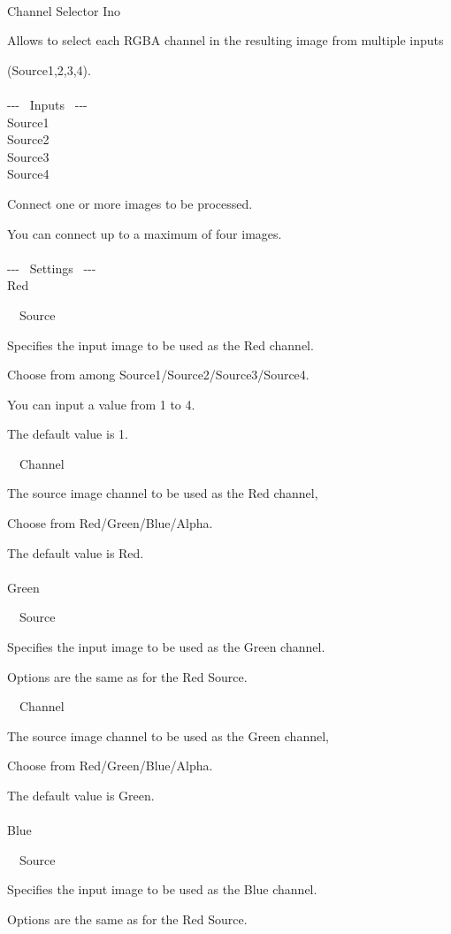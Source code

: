\documentclass[a4paper,12pt]{article}
\begin{document}
\thispagestyle{empty}

\Large
\noindent \\
Channel Selector Ino\medskip
\par
\normalsize
Allows to select each RGBA channel in the resulting image from multiple inputs\par 
(Source1,2,3,4).\\
\\
-{-}- \ Inputs \ -{-}-\\
Source1\\
Source2\\
Source3\\
Source4\par
Connect one or more images to be processed.\par
You can connect up to a maximum of four images.\\
\\
-{-}- \ Settings \ -{-}-\\
Red\par
\noindent \ \, Source\par
Specifies the input image to be used as the Red channel.\par
Choose from among Source1/Source2/Source3/Source4.\par
You can input a value from 1 to 4.\par
The default value is 1.\\
\par
\noindent \ \, Channel\par
The source image channel to be used as the Red channel,\par
Choose from Red/Green/Blue/Alpha.\par
The default value is Red.\\
\\
Green\par
\noindent \ \, Source\par
Specifies the input image to be used as the Green channel.\par
Options are the same as for the \textquotedbl Red Source\textquotedbl .\\
\par
\noindent \ \, Channel\par
The source image channel to be used as the Green channel,\par
Choose from Red/Green/Blue/Alpha.\par
The default value is Green.\\
\\
Blue\par
\noindent \ \, Source\par
Specifies the input image to be used as the Blue channel.\par
Options are the same as for the \textquotedbl Red Source\textquotedbl .\\
\end{document}
